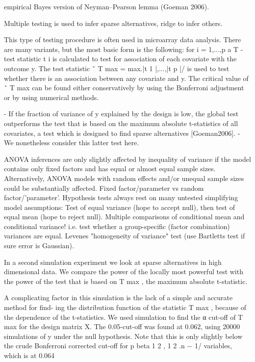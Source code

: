 \documentclass{article}
\begin{document}
empirical Bayes version of Neyman–Pearson lemma (Goeman 2006).

Multiple testing is used to infer sparse alternatives, ridge to infer others.

This type of testing procedure is often used in microarray data analysis. There are many variants, but the most basic form is the following: for i = 1,...,p a T -test statistic t i is calculated to test for association of each covariate with the outcome y. The test statistic ˜ T max = max.|t 1 |,...,|t p |/ is used to test whether there is an association between any covariate and y. The critical value of ˜ T max can be found either conservatively by using the Bonferroni adjustment or by using numerical methods.

    - If the fraction of variance of y explained by the design is low, the global test outperforms the test
that is based on the maximum absolute t-statistics of all covariates, a test which is designed to
find sparse alternatives [Goeman2006].
- We nonetheless consider this latter test here.

ANOVA inferences are only slightly affected by inequality of variance if the model contains only fixed factors and has equal or almost equal sample sizes. Alternatively, ANOVA models with random effects and/or unequal sample sizes could be substantially affected.
Fixed factor/parameter vs random factor/'parameter'. Hypothesis tests always rest on many untested simplifying model assumptions: Test of equal variance (hope to accept null), then test of equal mean (hope to reject null). Multiple comparisons of conditional mean and conditional variance! i.e. test whether a group-specific (factor combination) variances are equal. Levenes "homogeneity of variance" test (use Bartletts test if sure error is Gaussian).

In a second simulation experiment we look at sparse alternatives in high dimensional data.  We compare the power of the locally most powerful test with the power of the test that is based on T max , the maximum absolute t-statistic.

A complicating factor in this simulation is the lack of a simple and accurate method for find- ing the distribution function of the statistic T max , because of the dependence of the t-statistics.  We used simulation to find the α cut-off of T max for the design matrix X. The 0.05-cut-off was found at 0.062, using 20000 simulations of y under the null hypothesis. Note that this is only slightly below the crude Bonferroni corrected cut-off for p beta{ 1 2 , 1 2 .n − 1/} variables, which is at 0.064
\end{document}
